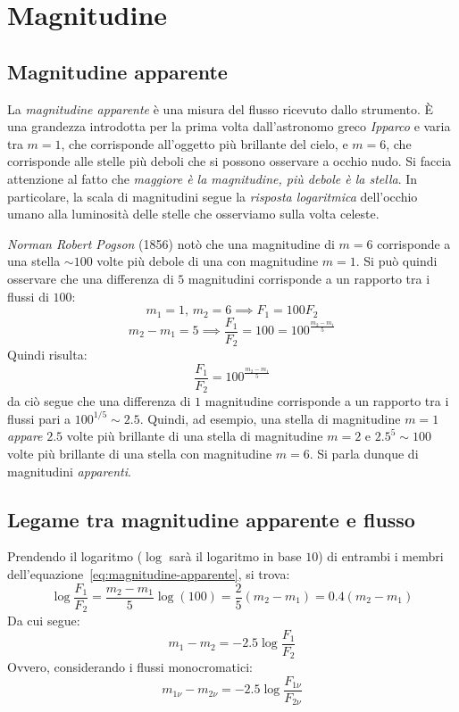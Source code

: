 \section{Magnitudine}\label{sec:magnitudine}
\subsection{Magnitudine apparente}\label{sec:magnitudine-apparente}
La \emph{magnitudine apparente} è una misura del flusso ricevuto dallo strumento. È una grandezza introdotta per la prima volta dall'astronomo greco \emph{Ipparco} e varia tra $m=1$, che corrisponde all'oggetto più brillante del cielo, e $m=6$, che corrisponde alle stelle più deboli che si possono osservare a occhio nudo. Si faccia attenzione al fatto che \emph{maggiore è la magnitudine, più debole è la stella}. In particolare, la scala di magnitudini segue la \emph{risposta logaritmica} dell'occhio umano alla luminosità delle stelle che osserviamo sulla volta celeste.

\emph{Norman Robert Pogson} (1856) notò che una magnitudine di $m=6$ corrisponde a una stella $\sim 100$ volte più debole di una con magnitudine $m=1$. Si può quindi osservare che una differenza di $5$ magnitudini corrisponde a un rapporto tra i flussi di $100$:
\[
    m_1=1, \,  m_2=6 \implies F_1 = 100 F_2
\]
\[
    m_2 - m_1 = 5 \implies \frac{F_1}{F_2} = 100 = 100^{\frac{m_2 - m_1}{5}}
\]
Quindi risulta:
\begin{equation}\label{eq:magnitudine-apparente}
    \frac{F_1}{F_2} = 100^{\frac{m_2 - m_1}{5}}
\end{equation}
da ciò segue che una differenza di $1$ magnitudine corrisponde a un rapporto tra i flussi pari a $100^{1 / 5} \sim 2.5$. Quindi, ad esempio, una stella di magnitudine $m=1$ \emph{appare} $2.5$ volte più brillante di una stella di magnitudine $m=2$ e $2.5^5 \sim 100$ volte più brillante di una stella con magnitudine $m=6$. Si parla dunque di magnitudini \emph{apparenti}.

\subsection{Legame tra magnitudine apparente e flusso}\label{sec:relazione-magnitudine-apparente-flusso}
Prendendo il logaritmo ($\log$ sarà il logaritmo in base $10$) di entrambi i membri dell'equazione~\eqref{eq:magnitudine-apparente}, si trova:
\[
    \log\frac{F_1}{F_2} = \frac{m_2 - m_1}{5} \log(100) = \frac{2}{5} (m_2 - m_1) = 0.4 (m_2 - m_1)
\]
Da cui segue:
\begin{equation}\label{eq:relazione-magnitudine-apparente-flusso}
    m_1 - m_2 = -2.5 \log\frac{F_1}{F_2}
\end{equation}
Ovvero, considerando i flussi monocromatici:
\begin{equation}\label{eq:relazione-magnitudine-apparente-flusso-monocromatico}
    m_{1\nu} - m_{2\nu} = -2.5 \log\frac{F_{1\nu}}{F_{2\nu}}
\end{equation}

